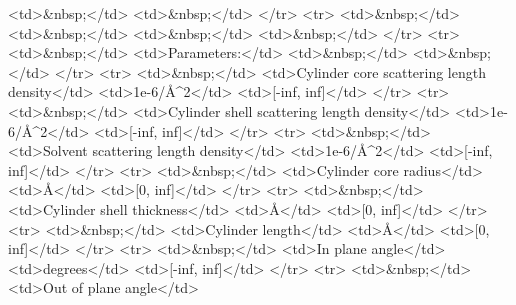 \textless{}td\textgreater{}\&nbsp;\textless{}/td\textgreater{} \textless{}td\textgreater{}\&nbsp;\textless{}/td\textgreater{} \textless{}/tr\textgreater{} \textless{}tr\textgreater{} \textless{}td\textgreater{}\&nbsp;\textless{}/td\textgreater{} \textless{}td\textgreater{}\&nbsp;\textless{}/td\textgreater{} \textless{}td\textgreater{}\&nbsp;\textless{}/td\textgreater{} \textless{}td\textgreater{}\&nbsp;\textless{}/td\textgreater{} \textless{}/tr\textgreater{} \textless{}tr\textgreater{} \textless{}td\textgreater{}\&nbsp;\textless{}/td\textgreater{} \textless{}td\textgreater{}Parameters:\textless{}/td\textgreater{} \textless{}td\textgreater{}\&nbsp;\textless{}/td\textgreater{} \textless{}td\textgreater{}\&nbsp;\textless{}/td\textgreater{} \textless{}/tr\textgreater{} \textless{}tr\textgreater{} \textless{}td\textgreater{}\&nbsp;\textless{}/td\textgreater{} \textless{}td\textgreater{}Cylinder core scattering length density\textless{}/td\textgreater{} \textless{}td\textgreater{}1e-6/\AA{}\textasciicircum{}2\textless{}/td\textgreater{} \textless{}td\textgreater{}[-inf, inf]\textless{}/td\textgreater{} \textless{}/tr\textgreater{} \textless{}tr\textgreater{} \textless{}td\textgreater{}\&nbsp;\textless{}/td\textgreater{} \textless{}td\textgreater{}Cylinder shell scattering length density\textless{}/td\textgreater{} \textless{}td\textgreater{}1e-6/\AA{}\textasciicircum{}2\textless{}/td\textgreater{} \textless{}td\textgreater{}[-inf, inf]\textless{}/td\textgreater{} \textless{}/tr\textgreater{} \textless{}tr\textgreater{} \textless{}td\textgreater{}\&nbsp;\textless{}/td\textgreater{} \textless{}td\textgreater{}Solvent scattering length density\textless{}/td\textgreater{} \textless{}td\textgreater{}1e-6/\AA{}\textasciicircum{}2\textless{}/td\textgreater{} \textless{}td\textgreater{}[-inf, inf]\textless{}/td\textgreater{} \textless{}/tr\textgreater{} \textless{}tr\textgreater{} \textless{}td\textgreater{}\&nbsp;\textless{}/td\textgreater{} \textless{}td\textgreater{}Cylinder core radius\textless{}/td\textgreater{} \textless{}td\textgreater{}\AA{}\textless{}/td\textgreater{} \textless{}td\textgreater{}[0, inf]\textless{}/td\textgreater{} \textless{}/tr\textgreater{} \textless{}tr\textgreater{} \textless{}td\textgreater{}\&nbsp;\textless{}/td\textgreater{} \textless{}td\textgreater{}Cylinder shell thickness\textless{}/td\textgreater{} \textless{}td\textgreater{}\AA{}\textless{}/td\textgreater{} \textless{}td\textgreater{}[0, inf]\textless{}/td\textgreater{} \textless{}/tr\textgreater{} \textless{}tr\textgreater{} \textless{}td\textgreater{}\&nbsp;\textless{}/td\textgreater{} \textless{}td\textgreater{}Cylinder length\textless{}/td\textgreater{} \textless{}td\textgreater{}\AA{}\textless{}/td\textgreater{} \textless{}td\textgreater{}[0, inf]\textless{}/td\textgreater{} \textless{}/tr\textgreater{} \textless{}tr\textgreater{} \textless{}td\textgreater{}\&nbsp;\textless{}/td\textgreater{} \textless{}td\textgreater{}In plane angle\textless{}/td\textgreater{} \textless{}td\textgreater{}degrees\textless{}/td\textgreater{} \textless{}td\textgreater{}[-inf, inf]\textless{}/td\textgreater{} \textless{}/tr\textgreater{} \textless{}tr\textgreater{} \textless{}td\textgreater{}\&nbsp;\textless{}/td\textgreater{} \textless{}td\textgreater{}Out of plane angle\textless{}/td\textgreater{} 